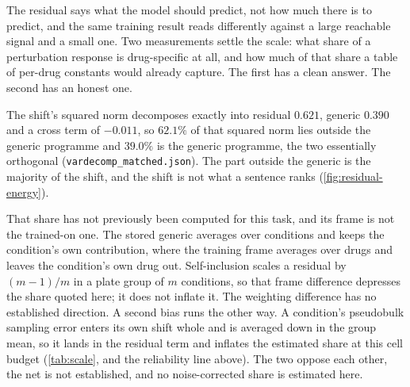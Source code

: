 \label{sec:methods-vardecomp}

\begin{question}[5]
The residual says what the model should predict, not how much there is to
predict, and the same training result reads differently against a large reachable
signal and a small one. Two measurements settle the scale: what share of a
perturbation response is drug-specific at all, and how much of that share a table
of per-drug constants would already capture. The first has a clean answer. The
second has an honest one.
\end{question}

\noindent
The shift's squared norm decomposes exactly into residual $0.621$, generic
$0.390$ and a cross term of $-0.011$, so $62.1\%$ of that squared norm lies
outside the generic programme and $39.0\%$ is the generic programme, the two
essentially orthogonal (\texttt{vardecomp\_matched.json}). The part outside the
generic is the majority of the shift, and the shift is not what a sentence ranks
(\cref{fig:residual-energy}).



That share has not previously been computed for this task, and its frame is not
the trained-on one. The stored generic averages over conditions and keeps the
condition's own contribution, where the training frame averages over drugs and
leaves the condition's own drug out. Self-inclusion scales a residual by
$(m-1)/m$ in a plate group of $m$ conditions, so that frame difference depresses
the share quoted here; it does not inflate it. The weighting difference has no
established direction. A second bias runs the other way. A condition's pseudobulk
sampling error enters its own shift whole and is averaged down in the group mean,
so it lands in the residual term and inflates the estimated share at this cell
budget (\cref{tab:scale}, and the reliability line above). The two oppose each
other, the net is not established, and no noise-corrected share is estimated
here.

